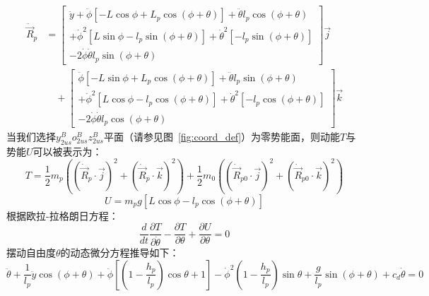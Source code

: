             \begin{equation}
            \begin{aligned}
            \ddot{\vec{R}}_p &= \begin{bmatrix}
            \ddot{y} + \ddot{\phi}\left[-L \cos \phi + L_p \cos(\phi + \theta)\right] + \ddot{\theta} l_p \cos(\phi + \theta) \\
            +\dot{\phi}^2\left[L \sin \phi - l_p \sin(\phi + \theta)\right] + \dot{\theta}^2\left[-l_p \sin(\phi + \theta)\right] \\
            -2\dot{\phi}\dot{\theta} l_p \sin(\phi + \theta)
            \end{bmatrix}\vec{j} \\
            &\quad + \begin{bmatrix}
            \ddot{\phi}\left[-L \sin \phi + L_p \cos(\phi + \theta)\right] + \ddot{\theta} l_p \sin(\phi + \theta) \\
            +\dot{\phi}^2\left[L \cos \phi - l_p \cos(\phi + \theta)\right] + \dot{\theta}^2\left[-l_p \cos(\phi + \theta)\right] \\
            -2\dot{\phi}\dot{\theta} l_p \cos(\phi + \theta)
            \end{bmatrix}\vec{k}
            \end{aligned}
            \end{equation}
            当我们选择$y_{2us}^B o_{2us}^B z_{2us}^B$平面（请参见图~\ref{fig:coord_def}）为零势能面，则动能$T$与势能$U$可以被表示为：
            \begin{equation}
            T = \frac{1}{2}m_p\left( \left(\dot{\vec{R}}_p \cdot \vec{j}\right)^2 + \left(\dot{\vec{R}}_p \cdot \vec{k}\right)^2 \right) + \frac{1}{2}m_0\left( \left(\dot{\vec{R}}_{p0} \cdot \vec{j}\right)^2 + \left(\dot{\vec{R}}_{p0} \cdot \vec{k}\right)^2 \right)
            \end{equation}
            \begin{equation}
            U = m_p g \left[ L \cos \phi - l_p \cos(\phi + \theta) \right]
            \end{equation}
            根据欧拉-拉格朗日方程：
            \begin{equation}
            \frac{d}{dt}\frac{\partial T}{\partial \dot{\theta}} - \frac{\partial T}{\partial \theta} + \frac{\partial U}{\partial \theta} = 0
            \end{equation}
            摆动自由度$\theta$的动态微分方程推导如下：
            \begin{equation}
            \ddot{\theta} + \frac{1}{l_p} \ddot{y} \cos(\phi + \theta) + \ddot{\phi}\left[ \left(1 - \frac{h_p}{l_p}\right)\cos\theta + 1 \right] - \dot{\phi}^2 \left(1 - \frac{h_p}{l_p}\right)\sin\theta + \frac{g}{l_p}\sin(\phi + \theta) + c_d \dot{\theta} = 0
            \end{equation}
